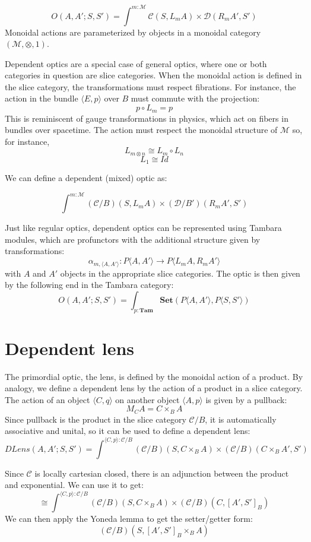 \documentclass[11pt]{amsart}
\begin{document}
\[ O(A, A'; S, S') =  \int^{m \colon \mathcal{M}} \mathcal{C}( S, L_m A) \times \mathcal{D}(R_m A', S') \]
Monoidal actions are parameterized by objects in a monoidal category $(\mathcal{M}, \otimes, 1)$.

Dependent optics are a special case of general optics, where one or both categories in question are slice categories. When the monoidal action is defined in the slice category, the transformations must respect fibrations. For instance, the action in the bundle $\langle E, p \rangle$ over $B$ must commute with the projection:
\[p \circ L_m = p \]
This is reminiscent of gauge transformations in physics, which act on fibers in bundles over spacetime. The action must respect the monoidal structure of $\mathcal{M}$ so, for instance,
\[L_{m \otimes n} \cong L_m \circ L_n \]
\[ L_1 \cong \mathit{Id} \]

We can define a dependent (mixed) optic as:

\[ \int^{m : \mathcal{M}} (\mathcal{C}/B)( S, L_m A) \times (\mathcal{D}/B')(R_m A', S') \]

Just like regular optics, dependent optics can be represented using Tambara modules, which are profunctors with the additional structure given by transformations:
\[ \alpha_{m, \langle A, A' \rangle} \colon P \langle A, A' \rangle \to P\langle L_m A, R_m A' \rangle \]
with $A$ and $A'$ objects in the appropriate slice categories.
The optic is then given by the following end in the Tambara category:
\[ O(A, A'; S, S') =  \int_{p : \mathbf{Tam}} \mathbf{Set}(P \langle A, A' \rangle, P \langle S, S' \rangle) \]


\section{Dependent lens}

The primordial optic, the lens, is defined by the monoidal action of a product. By analogy, we define a dependent lens by the action of a product in a slice category. The action of an object $\langle C, q \rangle$ on another object $ \langle A, p \rangle$ is given by a pullback:
\[ M_C A = C \times_B A \]
Since pullback is the product in the slice category $\mathcal{C}/B$, it is automatically associative and unital, so it can be used to define a dependent lens:
\[ \mathit{DLens}(A, A'; S, S') = \int^{\langle C, p \rangle : \mathcal{C}/B} (\mathcal{C}/B)( S, C \times_B A) \times (\mathcal{C}/B)(C \times_B A', S')\]


Since $\mathcal{C}$ is locally cartesian closed, there is an adjunction between the product and exponential. We can use it to get:
\[ \cong \int^{\langle C, p \rangle : \mathcal{C}/B} (\mathcal{C}/B)( S, C \times_B A) \times (\mathcal{C}/B)(C , [A', S']_B) \]
We can then apply the Yoneda lemma to get the setter/getter form:
\[  (\mathcal{C}/B)( S, [A', S']_B \times_B A) \]
\end{document}
